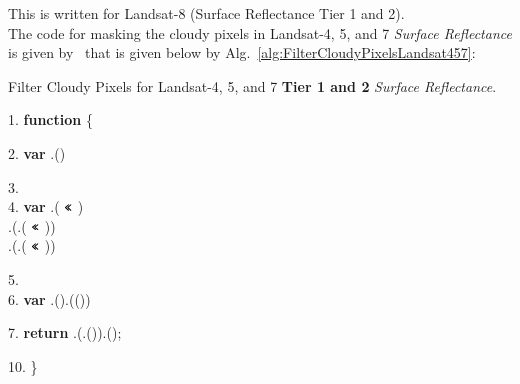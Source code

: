 \noindent \textbf{{\color{red}{Note:}}} This is
written for Landsat-8 (Surface Reflectance Tier 1 and 2).\\

The code for masking the cloudy pixels in Landsat-4, 5, and 7 
\emph{Surface Reflectance} is given by~\citep{Landsat457CloudMask}
that is given below by Alg.~\ref{alg:FilterCloudyPixelsLandsat457}:
\begin{tcolorbox}
  \begin{algorithm}[H]
  \label{alg:FilterCloudyPixelsLandsat457}
   \caption{Filter Cloudy Pixels for Landsat-4, 5, and 7 \textbf{Tier 1 and 2} \emph{Surface Reflectance}.}
\SetAlgoLined

1. \textbf{function} 
 \{

\vspace{.1in}
\hspace{.2in} 2. 
\textbf{var} .()\;

\vspace{.1in}
\hspace{.2in} 3. {}\\

\hspace{.2in} 4. 
\textbf{var} 
.( $\textbf{\texttt{<<}}$ )\\
\hspace{1.35in}   .(.( $\textbf{\texttt{<<}}$ ))\\
\hspace{1.35in}   .(.( $\textbf{\texttt{<<}}$ ))\;

\vspace{.1in} 

\hspace{.2in} 5.
{\color{ForestGreen}{// Remove edge pixels that don't occur in all bands}}\\

\hspace{.2in} 6.
\textbf{var} 
.().(())\;

\hspace{.2in} 7.
\small{\textbf{return} .(.()).();}
  
\hspace{.01in} 10. \}
\end{algorithm}
\end{tcolorbox}

